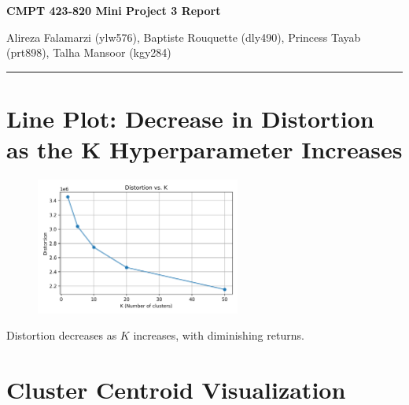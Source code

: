 \documentclass{article}
\begin{document}
\begin{centering}
\Large\textbf{{\sc CMPT 423-820 Mini Project 3 Report}}\\[1ex]
\begin{center}
\small{Alireza Falamarzi (ylw576), Baptiste Rouquette (dly490), Princess Tayab (prt898), Talha Mansoor (kgy284)}
\end{center}
\end{centering}
\hrule

\vspace{0.1in}
\section{Line Plot: Decrease in Distortion as the K Hyperparameter Increases}
\begin{figure}[H]
    \centering
    \vspace{-10pt}
    \includegraphics[width=0.6\textwidth]{figure/distortion_vs_k.png} 
\end{figure}
\vspace{-15pt}
\begin{center}
    Distortion decreases as \( K \) increases, with diminishing returns.
\end{center}


\section{Cluster Centroid Visualization}
\end{document}
